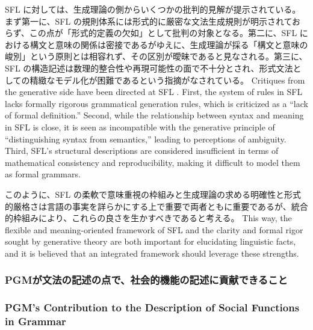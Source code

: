 \ifJPN
SFL に対しては、生成理論の側からいくつかの批判的見解が提示されている\parencite{newmeyer1998language,pullum2010central}。まず第一に、SFL の規則体系には形式的に厳密な文法生成規則が明示されておらず、この点が「形式的定義の欠如」として批判の対象となる。第二に、SFL における構文と意味の関係は密接であるがゆえに、生成理論が採る「構文と意味の峻別」という原則とは相容れず、その区別が曖昧であると見なされる。第三に、SFL の構造記述は数理的整合性や再現可能性の面で不十分とされ、形式文法としての精緻なモデル化が困難であるという指摘がなされている。
\else
Critiques from the generative side have been directed at SFL \parencite{newmeyer1998language,pullum2010central}. First, the system of rules in SFL lacks formally rigorous grammatical generation rules, which is criticized as a ``lack of formal definition.'' Second, while the relationship between syntax and meaning in SFL is close, it is seen as incompatible with the generative principle of ``distinguishing syntax from semantics,'' leading to perceptions of ambiguity. Third, SFL's structural descriptions are considered insufficient in terms of mathematical consistency and reproducibility, making it difficult to model them as formal grammars.
\fi

\ifJPN
このように、SFL の柔軟で意味重視の枠組みと生成理論の求める明確性と形式的厳格さは言語の事実を詳らかにする上で重要で両者ともに重要であるが、統合的枠組みにより、これらの良さを生かすべきであると考える。
\else
This way, the flexible and meaning-oriented framework of SFL and the clarity and formal rigor sought by generative theory are both important for elucidating linguistic facts, and it is believed that an integrated framework should leverage these strengths.
\fi

\ifJPN
\subsubsection{PGMが文法の記述の点で、社会的機能の記述に貢献できること}
\else
\subsubsection{PGM's Contribution to the Description of Social Functions in Grammar}
\fi

